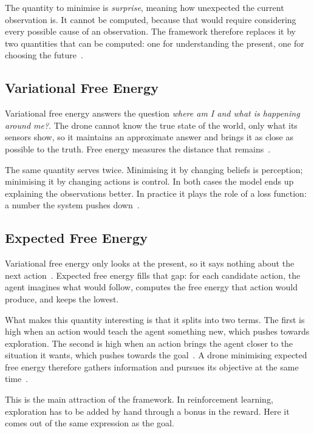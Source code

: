 The quantity to minimise is \emph{surprise}, meaning how unexpected the current
observation is. It cannot be computed, because that would require considering
every possible cause of an observation. The framework therefore replaces it by
two quantities that can be computed: one for understanding the present, one for
choosing the future~\cite{ji2024integration}.

\subsection{Variational Free Energy}%
\label{subsec:nav:vfe}

Variational free energy answers the question \emph{where am I and what is
happening around me?}. The drone cannot know the true state of the world, only
what its sensors show, so it maintains an approximate answer and brings it as
close as possible to the truth. Free energy measures the distance that
remains~\cite{ji2024integration}.

The same quantity serves twice. Minimising it by changing beliefs is perception;
minimising it by changing actions is control. In both cases the model ends up
explaining the observations better. In practice it plays the role of a loss
function: a number the system pushes down~\cite{ji2024integration}.

\subsection{Expected Free Energy}%
\label{subsec:nav:efe}

Variational free energy only looks at the present, so it says nothing about the
next action~\cite{ding2024external}. Expected free energy fills that gap: for
each candidate action, the agent imagines what would follow, computes the free
energy that action would produce, and keeps the lowest.

What makes this quantity interesting is that it splits into two terms. The first
is high when an action would teach the agent something new, which pushes towards
exploration. The second is high when an action brings the agent closer to the
situation it wants, which pushes towards the goal~\cite{fang2024resource}. A
drone minimising expected free energy therefore gathers information and pursues
its objective at the same time~\cite{wang2026bridging}.

This is the main attraction of the framework. In reinforcement learning,
exploration has to be added by hand through a bonus in the reward. Here it comes
out of the same expression as the goal.


